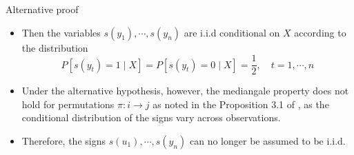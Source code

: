 \documentclass{beamer}
\begin{document}
\begin{frame}{Alternative proof}
\begin{itemize}
\item{}Then the variables $s(y_1),\cdots,s(y_n)$ are i.i.d conditional on $X$ according to the distribution
\[
P[s(y_t)=1\mid X]=P[s(y_t)=0\mid X]=\frac{1}{2},\quad t=1,\cdots,n
\]
\item{} Under the alternative hypothesis, however, the mediangale property does not hold for permutations $\pi:i\rightarrow j$ as noted in the Proposition 3.1 of , as the conditional distribution of the signs vary across observations.

\item{} Therefore, the signs $s(u_1),\cdots,s(y_n)$ can no longer be assumed to be i.i.d.
\end{itemize}
\end{frame}

%
%
\end{document}
